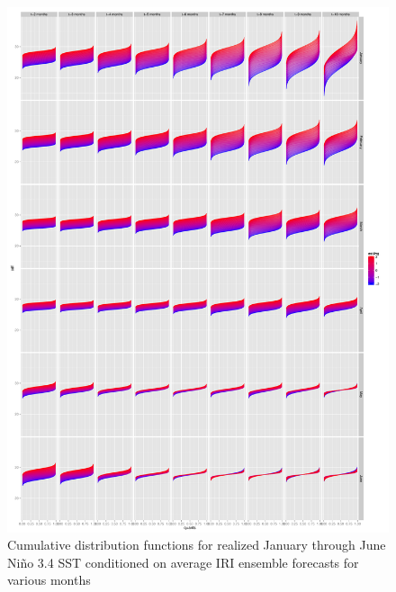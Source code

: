 \documentclass[authoryear]{article}
\begin{document}
\begin{figure}[!htbp]
  \includegraphics[width=\linewidth]{Pricingfigs/conditionalCDFsJantoJune}
  \caption{Cumulative distribution functions for realized January through June Ni\~no 3.4 SST conditioned on average IRI ensemble forecasts for various months}
   \label{fig:conditionalCDFsJantoJune}
\end{figure}
\end{document}
